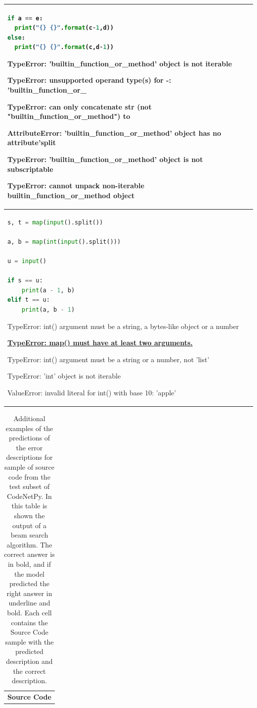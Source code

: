 \documentclass[12pt,a4paper]{report}
\begin{document}
\begin{appendices}
\begin{table}[H]
\begin{tabular}{p{15cm}}
\begin{lstlisting}[language=Python]
if a == e:
  print("{} {}".format(c-1,d))
else:
  print("{} {}".format(c,d-1))
\end{lstlisting}

TypeError: 'builtin\_function\_or\_method' object is not iterable

TypeError: unsupported operand type(s) for -: 'builtin\_function\_or\_

TypeError: can only concatenate str (not "builtin\_function\_or\_method") to

AttributeError: 'builtin\_function\_or\_method' object has no attribute'split

TypeError: 'builtin\_function\_or\_method' object is not subscriptable

\textbf{TypeError: cannot unpack non-iterable builtin\_function\_or\_method object}

\\

\hline
\begin{lstlisting}[language=Python]
s, t = map(input().split())

a, b = map(int(input().split()))

u = input()

if s == u:
    print(a - 1, b)
elif t == u:
    print(a, b - 1)
\end{lstlisting}

TypeError: int() argument must be a string, a bytes-like object or a number

\underline{\textbf{TypeError: map() must have at least two arguments.}}

TypeError: int() argument must be a string or a number, not 'list'

TypeError: 'int' object is not iterable

ValueError: invalid literal for int() with base 10: 'apple'

\\

\end{tabular}
\end{table}

\begin{table}[H]\small\linespread{1}
\centering
\caption{Additional examples of the predictions of the error descriptions for sample of source code from the test subset of CodeNetPy. In this table is shown the output of a beam search algorithm. The correct answer is in bold, and if the model predicted the right answer in underline and bold. Each cell contains the Source Code sample with the predicted description and the correct description.}
\label{tab:appendices4}
\begin{tabular}{p{15cm}}
\textbf{Source Code} \\


\end{tabular}
\end{table}
\end{appendices}
\end{document}
